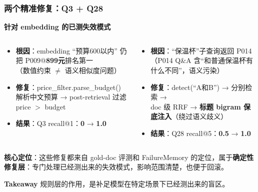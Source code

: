 \documentclass[aspectratio=169,10pt]{beamer}
\newcommand{\takeaway}[1]{%
  \vfill%
  \begin{tcolorbox}[
    colback=Ctakebg, colframe=Ctakebg,
    arc=0pt, boxrule=0pt,
    left=7pt, right=7pt, top=4pt, bottom=4pt,
    width=\linewidth, nobeforeafter
  ]%
    {\scriptsize\color{white}\textbf{Takeaway}\enspace%
     \color{white!88!Ctakebg}#1}%
  \end{tcolorbox}%
}
\newcommand{\hi}[1]{{\bfseries\color{Cgreen}#1}}      %
\newcommand{\bad}[1]{{\bfseries\color{Cred}#1}}       %
\newcommand{\mono}[1]{{\ttfamily\small\color{Cblue!90!black}#1}}  %
\begin{document}
\begin{frame}
\frametitle{两个精准修复：Q3 + Q28}

{\small\bfseries\color{Cmuted}针对 embedding 的已测失效模式}\\[0.08cm]
\begin{columns}[T]
\begin{tcolorbox}[tcblue, title={\color{Cblue}Q3 — 价格约束过滤}]
\small\begin{itemize}\setlength\itemsep{0.35em}
  \item \textbf{根因}：embedding ``预算600以内'' 仍把
    P009@\bad{899元}排名第一\\
    {\color{Cmuted}（数值约束 $\neq$ 语义相似度问题）}
  \item \textbf{修复}：\mono{price\_filter.parse\_budget()}\\
    解析中文预算 → post-retrieval 过滤 price $>$ budget
  \item \textbf{结果}：Q3 recall@1：\bad{0} → \hi{\textbf{1.0}}
\end{itemize}
\end{tcolorbox}

\begin{tcolorbox}[tcgreen, title={\color{Cgreen}Q28 — 复合查询分解}]
\small\begin{itemize}\setlength\itemsep{0.35em}
  \item \textbf{根因}：``保温杯''子查询返回 P014\\
    {\color{Cmuted}（P014 Q\&A 含``和普通保温杯有什么不同''，语义污染）}
  \item \textbf{修复}：detect(``A和B'') → 分别检索 →\\
    doc 级 RRF → \textbf{标题 bigram 保底注入}（绕过语义歧义）
  \item \textbf{结果}：Q28 recall@5：\bad{0.5} → \hi{\textbf{1.0}}
\end{itemize}
\end{tcolorbox}
\end{columns}

\vspace{0.22cm}
\begin{tcolorbox}[tcgray]
\small\textbf{核心定位}：这些修复都来自 gold-doc 评测和 FailureMemory 的定位，属于\textbf{确定性修复层}：专门处理已经测出来的失效模式，影响范围清楚，也便于回滚。
\end{tcolorbox}

\takeaway{规则层的作用，是补足模型在特定场景下已经测出来的盲区。}
\end{frame}
\end{document}
